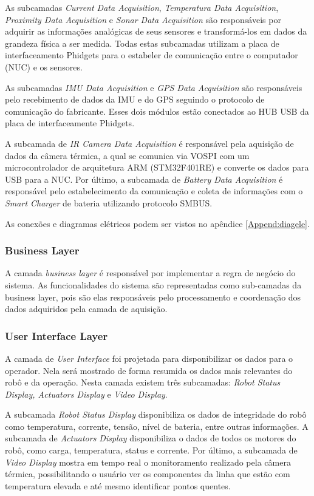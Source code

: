 As subcamadas \textit{Current Data Acquisition}, \textit{Temperatura Data Acquisition}, \textit{Proximity Data Acquisition} e \textit{Sonar Data Acquisition} são responsáveis por adquirir as informações analógicas de seus sensores e transformá-los em dados da grandeza física a ser medida. Todas estas subcamadas utilizam a placa de interfaceamento Phidgets para o estabeler de comunicação entre o computador (NUC) e os sensores.

As subcamadas \textit{IMU Data Acquisition} e \textit{GPS Data Acquisition} são responsáveis pelo recebimento de dados da IMU e do GPS seguindo o protocolo de comunicação do fabricante. Esses dois módulos estão conectados ao HUB USB da placa de interfaceamente Phidgets. 

A subcamada de \textit{IR Camera Data Acquisition} é responsável pela aquisição de dados da câmera térmica, a qual se comunica via VOSPI com um microcontrolador de arquitetura ARM (STM32F401RE) e converte os dados para USB para a NUC. 
Por último, a subcamada de \textit{Battery Data Acquisition} é responsável pelo estabelecimento da comunicação e coleta de informações com o \textit{Smart Charger} de bateria utilizando protocolo SMBUS.

As conexões e diagramas elétricos podem ser vistos no apêndice \ref{Append:diagele}.

\subsubsection{Business Layer}

A camada \textit{business layer} é responsável por implementar a regra de negócio do sistema. As funcionalidades do sistema são representadas como sub-camadas da business layer, pois são elas responsáveis pelo processamento e coordenação dos dados adquiridos pela camada de aquisição.

\subsubsection{User Interface Layer}

A camada de \textit{User Interface} foi projetada para disponibilizar os dados para o operador. Nela será mostrado de forma resumida os dados mais relevantes do robô e da operação. Nesta camada existem três subcamadas: \textit{Robot Status Display, Actuators Display} e \textit{Video Display}. 

A subcamada \textit{Robot Status Display} disponibiliza os dados de integridade do robô como temperatura, corrente, tensão, nível de bateria, entre outras informações. A subcamada de \textit{Actuators Display} disponibiliza o dados de todos os motores do robô, como carga, temperatura, status e corrente. Por último, a subcamada de \textit{Video Display} mostra em tempo real o monitoramento realizado pela câmera térmica, possibilitando o usuário ver os componentes da linha que estão com temperatura elevada e até mesmo identificar pontos quentes.

